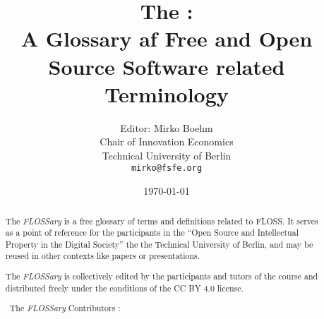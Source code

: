 \documentclass[a4paper]{article}
\title{The \flossary:\\
  A Glossary af Free and Open Source Software related Terminology}
\author{Editor: Mirko Boehm\\
  Chair of Innovation Economics\\
  Technical University of Berlin\\
  \texttt{mirko@fsfe.org}}
\date{\today}
\newcommand{\flossary}{{\em FLOSSary} }
\begin{document}
\maketitle \thispagestyle{empty}
\begin{abstract}
  \noindent
  The \flossary is a free glossary of terms and definitions related to
  \gls{FLOSS}. It serves as a point of reference for the participants
  in the ``Open Source and Intellectual Property in the Digital
  Society'' the the Technical University of Berlin, and may be reused
  in other contexts like papers or presentations.

  The \flossary is
  collectively edited by the participants and tutors of the course and
  distributed freely under the conditions of the CC BY 4.0 license.

  \vspace{0.5cm}
  \noindent \textcopyright~The \flossary Contributors \ccby:
  \\ 
\end{abstract}

\clearpage
\glsaddall
\printnoidxglossary[nonumberlist]
\clearpage
\printnoidxglossary[type=\acronymtype,nonumberlist]
\clearpage

\end{document}
